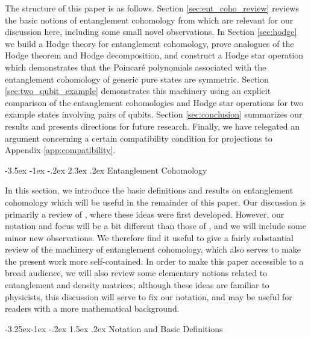 \documentclass[12pt]{article}
\makeatletter
\renewcommand\section{\@startsection {section}{1}{\z@}%
                                   {-3.5ex \@plus -1ex \@minus -.2ex}%
                                   {2.3ex \@plus.2ex}%
                                   {\normalfont\large\bfseries}}
\renewcommand\subsection{\@startsection{subsection}{2}{\z@}%
                                     {-3.25ex\@plus -1ex \@minus -.2ex}%
                                     {1.5ex \@plus .2ex}%
                                     {\normalfont\bfseries}}
\numberwithin{equation}{section}
\makeatother
\begin{document}
The structure of this paper is as follows. Section \ref{sec:ent_coho_review} reviews the basic notions of entanglement cohomology from \cite{Mainiero:2019enr} which are relevant for our discussion here, including some small novel observations. In Section \ref{sec:hodge} we build a Hodge theory for entanglement cohomology, prove analogues of the Hodge theorem and Hodge decomposition, and construct a Hodge star operation which demonstrates that the Poincar\'e polynomials associated with the entanglement cohomology of generic pure states are symmetric. 
%
Section \ref{sec:two_qubit_example} demonstrates this machinery using an explicit comparison of the entanglement cohomologies and Hodge star operations for two example states involving pairs of qubits.
%
Section \ref{sec:conclusion} summarizes our results and presents directions for future research. Finally, we have relegated an argument concerning a certain compatibility condition for projections to Appendix \ref{app:compatibility}.




\section{Entanglement Cohomology}\label{sec:ent_coho_review}

In this section, we introduce the basic definitions and results on entanglement cohomology which will be useful in the remainder of this paper. Our discussion is primarily a review of \cite{Mainiero:2019enr}, where these ideas were first developed. However, our notation and focus will be a bit different than those of \cite{Mainiero:2019enr}, and we will include some minor new observations. We therefore find it useful to give a fairly substantial review of the machinery of entanglement cohomology, which also serves to make the present work more self-contained. In order to make this paper accessible to a broad audience, we will also review some elementary notions related to entanglement and density matrices; although these ideas are familiar to physicists, this discussion will serve to fix our notation, and may be useful for readers with a more mathematical background.

\subsection{Notation and Basic Definitions}\label{sec:defns}
\end{document}
